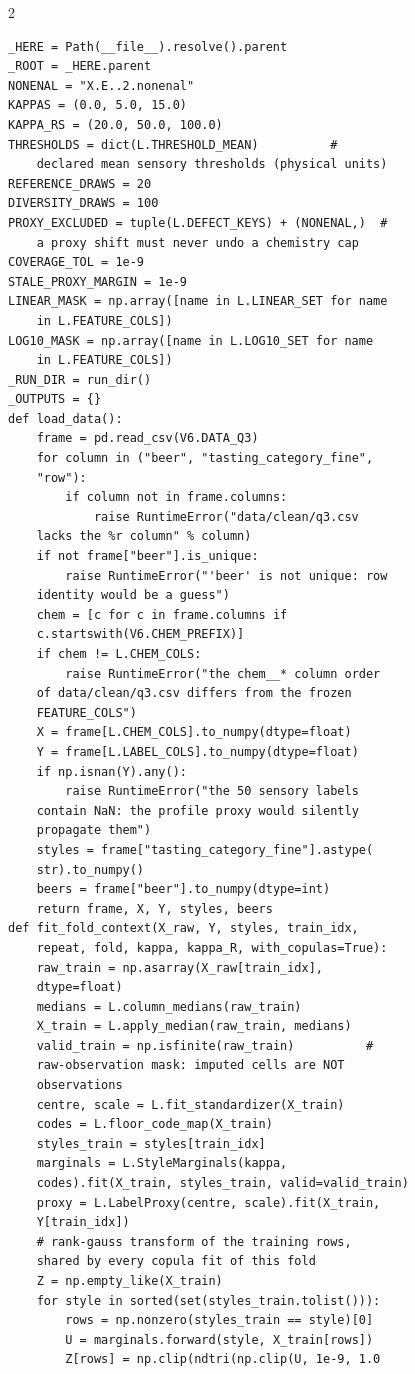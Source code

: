 \begin{multicols}{2}
\begin{Verbatim}[fontsize=\scriptsize]
_HERE = Path(__file__).resolve().parent
_ROOT = _HERE.parent
NONENAL = "X.E..2.nonenal"
KAPPAS = (0.0, 5.0, 15.0)
KAPPA_RS = (20.0, 50.0, 100.0)
THRESHOLDS = dict(L.THRESHOLD_MEAN)          #
    declared mean sensory thresholds (physical units)
REFERENCE_DRAWS = 20
DIVERSITY_DRAWS = 100
PROXY_EXCLUDED = tuple(L.DEFECT_KEYS) + (NONENAL,)  #
    a proxy shift must never undo a chemistry cap
COVERAGE_TOL = 1e-9
STALE_PROXY_MARGIN = 1e-9
LINEAR_MASK = np.array([name in L.LINEAR_SET for name
    in L.FEATURE_COLS])
LOG10_MASK = np.array([name in L.LOG10_SET for name
    in L.FEATURE_COLS])
_RUN_DIR = run_dir()
_OUTPUTS = {}
def load_data():
    frame = pd.read_csv(V6.DATA_Q3)
    for column in ("beer", "tasting_category_fine",
    "row"):
        if column not in frame.columns:
            raise RuntimeError("data/clean/q3.csv
    lacks the %r column" % column)
    if not frame["beer"].is_unique:
        raise RuntimeError("'beer' is not unique: row
    identity would be a guess")
    chem = [c for c in frame.columns if
    c.startswith(V6.CHEM_PREFIX)]
    if chem != L.CHEM_COLS:
        raise RuntimeError("the chem__* column order
    of data/clean/q3.csv differs from the frozen
    FEATURE_COLS")
    X = frame[L.CHEM_COLS].to_numpy(dtype=float)
    Y = frame[L.LABEL_COLS].to_numpy(dtype=float)
    if np.isnan(Y).any():
        raise RuntimeError("the 50 sensory labels
    contain NaN: the profile proxy would silently
    propagate them")
    styles = frame["tasting_category_fine"].astype(
    str).to_numpy()
    beers = frame["beer"].to_numpy(dtype=int)
    return frame, X, Y, styles, beers
def fit_fold_context(X_raw, Y, styles, train_idx,
    repeat, fold, kappa, kappa_R, with_copulas=True):
    raw_train = np.asarray(X_raw[train_idx],
    dtype=float)
    medians = L.column_medians(raw_train)
    X_train = L.apply_median(raw_train, medians)
    valid_train = np.isfinite(raw_train)          #
    raw-observation mask: imputed cells are NOT
    observations
    centre, scale = L.fit_standardizer(X_train)
    codes = L.floor_code_map(X_train)
    styles_train = styles[train_idx]
    marginals = L.StyleMarginals(kappa,
    codes).fit(X_train, styles_train, valid=valid_train)
    proxy = L.LabelProxy(centre, scale).fit(X_train,
    Y[train_idx])
    # rank-gauss transform of the training rows,
    shared by every copula fit of this fold
    Z = np.empty_like(X_train)
    for style in sorted(set(styles_train.tolist())):
        rows = np.nonzero(styles_train == style)[0]
        U = marginals.forward(style, X_train[rows])
        Z[rows] = np.clip(ndtri(np.clip(U, 1e-9, 1.0

\end{Verbatim}
\end{multicols}
